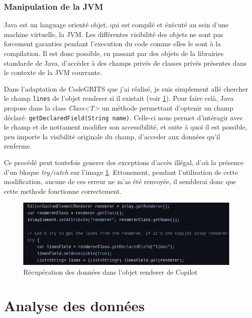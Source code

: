 \subsubsection{Manipulation de la JVM}

Java est un language orienté objet, qui est compilé et éxécuté au sein d'une machine virtuelle, la JVM.
Les différentes visibilité des objets ne sont pas forcement garanties pendant l'execution du code comme elles le sont à la compilation.
Il est donc possible, en passant par des objets de la librairies standarde de Java, d'accèder à des champs privés de classes privés présentes
dans le contexte de la JVM courrante.

Dans l'adaptation de CodeGRITS que j'ai réalisé, je suis simplement allé chercher le champ \lstinline{lines} de l'objet renderer si il existait (voir \ref{getting-the-lines}).
Pour faire celà, Java propose dans la class \emph{Class<T>} un méthode permettant d'optenir un champ déclaré: \lstinline{getDeclaredField(String name)}.
Celle-ci nous permet d'intéragir avec le champ et de nottament modifier son accessibilité, et suite à quoi il est possible, peu importe la visibilité originale du champ,
d'acceder aux données qu'il renferme.

Ce procédé peut toutefois generer des exceptions d'accès illégal, d'où la présence d'un bloque \emph{try/catch} sur l'image \ref{getting-the-lines}.
Ettonement, pendant l'utilisation de cette modification, aucune de ces erreur ne m'as été renvoyée, il semblerai donc que cette methode fonctionne correctement.

\begin{figure}
  \centering
  \includegraphics[width=15cm]{images/getting-the-lines.png}
  \caption{Récupération des données dans l'objet renderer de Copilot}
  \label{getting-the-lines}
\end{figure}


\newpage
\section{Analyse des données}

